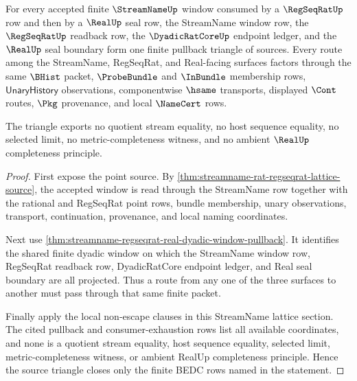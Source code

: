 \begin{theorem}
\label{thm:streamname-regseqrat-real-window-source-triangle}
For every accepted finite $\StreamNameUp$ window consumed by a $\RegSeqRatUp$ row and then by a $\RealUp$ seal row, the StreamName window row, the $\RegSeqRatUp$ readback row, the $\DyadicRatCoreUp$ endpoint ledger, and the $\RealUp$ seal boundary form one finite pullback triangle of sources. Every route among the StreamName, RegSeqRat, and Real-facing surfaces factors through the same $\BHist$ packet, $\ProbeBundle$ and $\InBundle$ membership rows, $\mathsf{UnaryHistory}$ observations, componentwise $\hsame$ transports, displayed $\Cont$ routes, $\Pkg$ provenance, and local $\NameCert$ rows.

The triangle exports no quotient stream equality, no host sequence equality, no selected limit, no metric-completeness witness, and no ambient $\RealUp$ completeness principle.
\end{theorem}
\begin{proof}
First expose the point source. By \autoref{thm:streamname-rat-regseqrat-lattice-source}, the accepted window is read through the StreamName row together with the rational and RegSeqRat point rows, bundle membership, unary observations, transport, continuation, provenance, and local naming coordinates.

Next use \autoref{thm:streamname-regseqrat-real-dyadic-window-pullback}. It identifies the shared finite dyadic window on which the StreamName window row, RegSeqRat readback row, DyadicRatCore endpoint ledger, and Real seal boundary are all projected. Thus a route from any one of the three surfaces to another must pass through that same finite packet.

Finally apply the local non-escape clauses in this StreamName lattice section. The cited pullback and consumer-exhaustion rows list all available coordinates, and none is a quotient stream equality, host sequence equality, selected limit, metric-completeness witness, or ambient RealUp completeness principle. Hence the source triangle closes only the finite BEDC rows named in the statement.
\end{proof}

